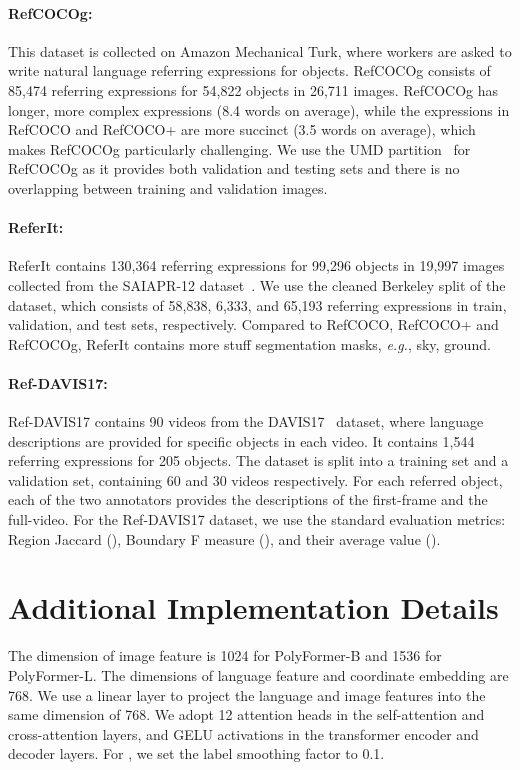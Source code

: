 \paragraph{\textbf{RefCOCOg}:} This dataset is collected on Amazon Mechanical Turk, where workers are asked to write natural language referring expressions for objects. RefCOCOg consists of 85,474 referring expressions for 54,822
objects in 26,711 images. RefCOCOg has longer, more complex expressions (8.4 words on average), while the expressions in RefCOCO and RefCOCO+ are more succinct (3.5 words on average), which makes RefCOCOg particularly challenging. We use the UMD partition~\cite{nagaraja2016modeling} for RefCOCOg as it provides both validation and testing sets and there is no overlapping between training and validation images. 

\paragraph{\textbf{ReferIt}:} ReferIt contains 130,364 referring expressions for 99,296 objects in 19,997 images collected from the SAIAPR-12 dataset~\cite{ESCALANTE2010419}. We use the cleaned
Berkeley split of the dataset, which consists of 58,838, 6,333, and 65,193 referring expressions in train, validation, and test sets, respectively. Compared to RefCOCO, RefCOCO+ and RefCOCOg, ReferIt contains more stuff segmentation masks, \textit{e.g.}, sky, ground. 

\paragraph{\textbf{Ref-DAVIS17}:} Ref-DAVIS17 contains 90 videos from the DAVIS17~\cite{pont20172017} dataset, where language descriptions are provided for specific objects in each video. It contains 1,544 referring expressions for 205 objects. The dataset is split into a training set and a validation set, containing 60 and 30 videos respectively. For each referred object, each of the two annotators  provides the descriptions of the first-frame and the full-video. For the Ref-DAVIS17 dataset, we use the standard evaluation metrics:  Region Jaccard (), Boundary F measure (), and their average value ().

\section{Additional Implementation Details}
The dimension of image feature
 is 1024 for PolyFormer-B and 1536 for PolyFormer-L. The dimensions of language feature  and coordinate embedding  are 768. We use a linear layer to project the language and image features into the same dimension of 768. We adopt 12 attention heads in the self-attention and cross-attention layers, and GELU activations in the transformer encoder and decoder layers. For , we set the label smoothing factor to 0.1.

